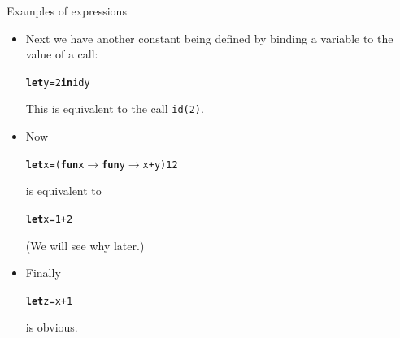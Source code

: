 \documentclass[compress,dvipdfmx]{beamer}
\begin{document}
\begin{frame}[fragile]{Examples of expressions}

  \begin{itemize}

    \item Next we have another constant being defined by binding a
      variable to the value of a call:
      \vspace*{-3mm}
\begin{alltt}
\small
\textbf{let} y = 2 \textbf{in} id y
\end{alltt}
      This is equivalent to the call \texttt{\small id(2)}.

    \item Now
      \vspace*{-3mm}
\begin{alltt}
\small
\textbf{let} x = (\textbf{fun} x \(\rightarrow\) \textbf{fun} y \(\rightarrow\) x + y) 1 2
\end{alltt}
      is equivalent to
      \vspace*{-3mm}
\begin{alltt}
\small
\textbf{let} x = 1 + 2
\end{alltt}
      (We will see why later.)

    \item Finally
      \vspace*{-3mm}
\begin{alltt}
\small
\textbf{let} z = x + 1
\end{alltt}
       is obvious.

  \end{itemize}

\end{frame}
\end{document}
